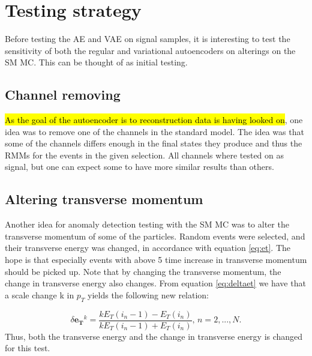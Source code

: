 \section*{Testing strategy}

Before testing the AE and VAE on signal samples, it is interesting to test the sensitivity of both the regular and variational autoencoders 
on alterings on the SM MC. This can be thought of as initial testing. 
\subsection*{Channel removing}
\hl{As the goal of the autoencoder is to reconstruction data is having looked on}, one idea was to remove one of the channels in the standard model.
The idea was that some of the channels differs enough in the final states they produce and thus the RMMs for the events in the given selection. 
All channels where tested on as signal, but one can expect some to have more similar results than others. 

\subsection*{Altering transverse momentum}
Another idea for anomaly detection testing with the SM MC was to alter the transverse momentum of some of the particles. Random events were
selected, and their transverse energy was changed, in accordance with equation \ref{eq:et}. The hope is that especially events with above 5 time 
increase in transverse momentum should be picked up. Note that by changing the transverse momentum, the change in transverse energy also changes. 
From equation \ref{eq:deltaet} we have that a scale change k in $p_T$ yields the following new relation:

\begin{equation}\label{eq:deltaet_scale}
    \delta\boldsymbol{e_T}^k = \frac{kE_T(i_n-1) - E_T(i_n)}{kE_T(i_n-1) + E_T(i_n)}, \, n = 2, ..., N.
\end{equation}
Thus, both the transverse energy and the change in transverse energy is changed for this test.


